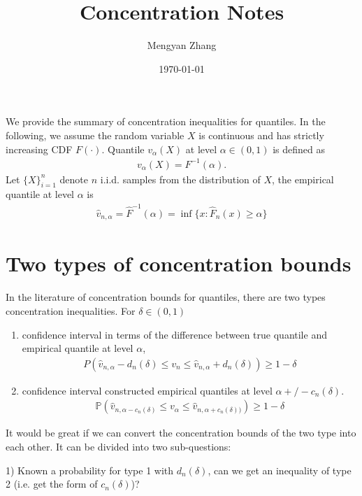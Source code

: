 \documentclass{article}
\title{Concentration Notes}
\author{Mengyan Zhang}
\date{\today}
\theoremstyle{plain}
\begin{document}
\maketitle

We provide the summary of concentration inequalities for quantiles. In the following, we assume the random variable $X$ is continuous and has strictly increasing CDF $F(\cdot)$. Quantile $v_\alpha(X)$ at level $\alpha \in (0,1)$ is defined as 
\begin{align}
    v_\alpha(X) = F^{-1}(\alpha).
\end{align}
Let $\{X\}_{i = 1}^n$ denote $n$ i.i.d. samples from the distribution of $X$, the empirical quantile at level $\alpha$ is 
\begin{align}
    \hat{v}_{n, \alpha} = \hat{F}^{-1}(\alpha) = \inf \{x: \hat{F}_n(x) \geq \alpha \}
\end{align}

\section{Two types of concentration bounds}

In the literature of concentration bounds for quantiles, there are two types concentration inequalities. For $\delta \in (0,1)$

\begin{enumerate}
    \item confidence interval in terms of the difference between true quantile and empirical quantile at level $\alpha$,
    \begin{align}
    \label{bound type 1}
         P\left(\hat{v}_{n, \alpha}-d_{n}(\delta) \leq v_{n} \leq \hat{v}_{ n, \alpha}+d_n(\delta)\right) \geq 1-\delta
    \end{align}
   
    \item confidence interval constructed empirical quantiles at level $\alpha +/- c_n(\delta)$. 
    \begin{align}
    \label{bound type 2}
        \mathbb{P}\left(\hat{v}_{n, \alpha- c_n(\delta)} \leq v_{\alpha} \leq \hat{v}_{n, \alpha+ c_n(\delta))} \right) \geq 1 - \delta
    \end{align}
\end{enumerate}

It would be great if we can convert the concentration bounds of the two type into each other. It can be divided into two sub-questions:

1) Known a probability for type 1 with $d_n(\delta)$, can we get an inequality of type 2 (i.e. get the form of $c_n(\delta)$)? 
\end{document}
